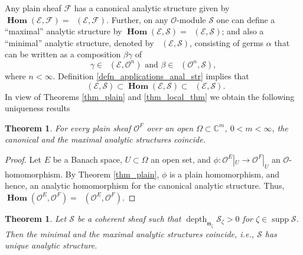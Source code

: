 \documentclass{amsart}
\numberwithin{equation}{section}
\theoremstyle{definition}
\theoremstyle{plain}
\newtheorem{theorem}[definition]{Theorem}
\theoremstyle{remark}
\begin{document}
Any plain sheaf ${\ensuremath{\mathcal{{F}}}}$ has a canonical analytic structure 
given by
${{\mathop{\mathbf{Hom}}}}({\ensuremath{\mathcal{{E}}}},{\ensuremath{\mathcal{{F}}}})={{\mathop{\mathbf{Hom}_\mathrm{plain}}}}({\ensuremath{\mathcal{{E}}}},{\ensuremath{\mathcal{{F}}}})$. 
Further, on any ${\ensuremath{\mathcal{{O}}}}$-module ${\ensuremath{\mathcal{{S}}}}$ one can define a
``maximal'' analytic structure by ${{\mathop{\mathbf{Hom}}}}({\ensuremath{\mathcal{{E}}}},{\ensuremath{\mathcal{{S}}}})={{\mathop{\mathbf{Hom}_{\ensuremath{\mathcal{{O}}}}}}}({\ensuremath{\mathcal{{E}}}},{\ensuremath{\mathcal{{S}}}})$;
and also a ``minimal'' analytic structure, denoted by ${{\mathop{\mathbf{Hom}_\mathrm{min}}}}({\ensuremath{\mathcal{{E}}}},{\ensuremath{\mathcal{{S}}}})$,
consisting of germs $\alpha$ that can be written  as a composition $\beta\gamma$ 
of 
\[
\gamma\in{{\mathop{\mathbf{Hom}_\mathrm{plain}}}}({\ensuremath{\mathcal{{E}}}},{\ensuremath{\mathcal{{O}}}}^n)\text{ and }\beta\in{{\mathop{\mathbf{Hom}_{\ensuremath{\mathcal{{O}}}}}}}({\ensuremath{\mathcal{{O}}}}^n,{\ensuremath{\mathcal{{S}}}}),
\]
where $n<\infty$. Definition \ref{defn_applications_anal_str} implies
that 
\[
	{{\mathop{\mathbf{Hom}_\mathrm{min}}}}({\ensuremath{\mathcal{{E}}}},{\ensuremath{\mathcal{{S}}}})\subset
	{{\mathop{\mathbf{Hom}}}}({\ensuremath{\mathcal{{E}}}},{\ensuremath{\mathcal{{S}}}})\subset
	{{\mathop{\mathbf{Hom}_{\ensuremath{\mathcal{{O}}}}}}}({\ensuremath{\mathcal{{E}}}},{\ensuremath{\mathcal{{S}}}}).
\]
In view of Theorems \ref{thm_plain} and \ref{thm_local_thm} we obtain 
the following uniqueness results
\begin{theorem}
For every plain sheaf ${\ensuremath{\mathcal{{O}}}}^F$ over  an open  $\Omega\subset\mathbb{C}^m$, $0<m<\infty$, the canonical and the maximal analytic structures coincide.
\end{theorem}
\begin{proof}
Let $E$ be a Banach space, $U\subset\Omega$ an open set, and 
$\phi:{\ensuremath{\mathcal{{O}}}}^E|_U\rightarrow{\ensuremath{\mathcal{{O}}}}^F|_U$ an ${\ensuremath{\mathcal{{O}}}}$-homomorphism. 
By Theorem \ref{thm_plain},
$\phi$ is a plain homomorphism, and hence, an analytic homomorphism for the
canonical analytic structure.
Thus, ${{\mathop{\mathbf{Hom}}}}({\ensuremath{\mathcal{{O}}}}^E,{\ensuremath{\mathcal{{O}}}}^F)={{\mathop{\mathbf{Hom}_{\ensuremath{\mathcal{{O}}}}}}}({\ensuremath{\mathcal{{O}}}}^E,{\ensuremath{\mathcal{{O}}}}^F)$.
\end{proof}
\begin{theorem}\label{thm_coh_unique_anal_str}
Let ${\ensuremath{\mathcal{{S}}}}$ be a coherent sheaf such that ${\mathop{\mathrm{depth}}\nolimits _{{{{\mathop{\mathfrak{m}}}}_\zeta}}} {\ensuremath{\mathcal{{S}}}}_\zeta>0$ for
$\zeta\in{\mathop{\mathrm{supp}}} {\ensuremath{\mathcal{{S}}}}$. Then the minimal and the maximal analytic structures
coincide, i.e., ${\ensuremath{\mathcal{{S}}}}$ has unique analytic structure.
\end{theorem}
\end{document}
